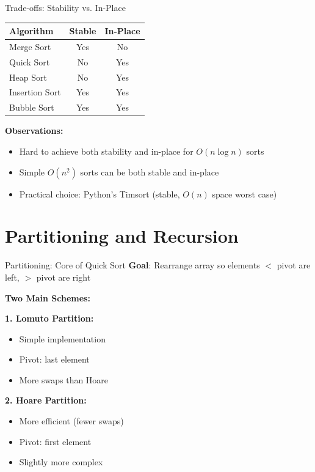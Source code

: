 \documentclass[aspectratio=169]{beamer}
\begin{document}
\begin{frame}{Trade-offs: Stability vs. In-Place}
  \begin{center}
  \begin{tabular}{|l|c|c|}
    \hline
    \textbf{Algorithm} & \textbf{Stable} & \textbf{In-Place} \\
    \hline
    Merge Sort & Yes & No \\
    \hline
    Quick Sort & No & Yes \\
    \hline
    Heap Sort & No & Yes \\
    \hline
    Insertion Sort & Yes & Yes \\
    \hline
    Bubble Sort & Yes & Yes \\
    \hline
  \end{tabular}
  \end{center}

  \vspace{0.3cm}
  \textbf{Observations:}
  \begin{itemize}
    \item Hard to achieve both stability and in-place for $O(n \log n)$ sorts
    \item Simple $O(n^2)$ sorts can be both stable and in-place
    \item Practical choice: Python's Timsort (stable, $O(n)$ space worst case)
  \end{itemize}
\end{frame}

\section{Partitioning and Recursion}

\begin{frame}{Partitioning: Core of Quick Sort}
  \textbf{Goal}: Rearrange array so elements $< $ pivot are left, $>$ pivot are right

  \vspace{0.3cm}
  \textbf{Two Main Schemes:}

  \vspace{0.2cm}
  \textbf{1. Lomuto Partition:}
  \begin{itemize}
    \item Simple implementation
    \item Pivot: last element
    \item More swaps than Hoare
  \end{itemize}

  \vspace{0.2cm}
  \textbf{2. Hoare Partition:}
  \begin{itemize}
    \item More efficient (fewer swaps)
    \item Pivot: first element
    \item Slightly more complex
  \end{itemize}
\end{frame}
\end{document}
